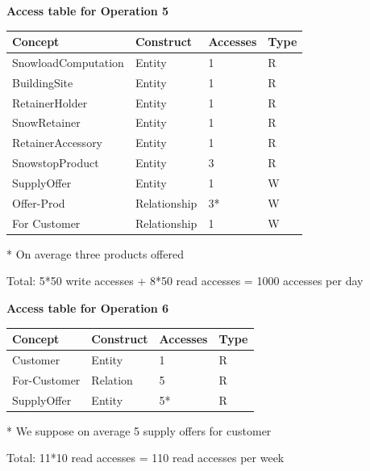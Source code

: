 \documentclass{article}[h]
\begin{document}
{{\vspace{12px}

{\centering \textbf{Access table for Operation 5}\\}
\begin{table}[H]
  \def\arraystretch{1.10}%
  \centering
  \begin{tabular}{ | m{4cm} | m{4cm}| m{3cm} | m{2cm} |} 
    \hline
    {\textbf{\large Concept}} & {\textbf{\large Construct}} & {\textbf{\large Accesses}} & {\textbf{\large Type}} \\
    \hline
    \color[HTML]{3531FF} SnowloadComputation & Entity & 1 & R \\ 
    \hline
    \color[HTML]{3531FF} BuildingSite & Entity & 1 & R \\ 
    \hline
    \color[HTML]{3531FF} RetainerHolder & Entity & 1 & R \\ 
    \hline
    \color[HTML]{3531FF} SnowRetainer & Entity & 1 & R \\ 
    \hline
    \color[HTML]{3531FF} RetainerAccessory & Entity & 1 & R \\ 
    \hline
    \color[HTML]{3531FF} SnowstopProduct & Entity & 3 & R \\ 
    \hline
    \color[HTML]{3531FF} SupplyOffer & Entity & 1 & W \\ 
    \hline
    \color[HTML]{3531FF} Offer-Prod & Relationship & 3* & W \\ 
    \hline
    \color[HTML]{3531FF} For Customer & Relationship & 1 & W \\ 
    \hline
  \end{tabular}
  \small{* On average three products offered}
\end{table}
Total: 5*50 write accesses + 8*50 read accesses = 1000 accesses per day

\vspace{12px}

{\centering \textbf{Access table for Operation 6}\\}
\begin{table}[H]
  \def\arraystretch{1.10}%
  \centering
  \begin{tabular}{ | m{4cm} | m{4cm}| m{3cm} | m{2cm} |} 
    \hline
    {\textbf{\large Concept}} & {\textbf{\large Construct}} & {\textbf{\large Accesses}} & {\textbf{\large Type}} \\
    \hline
    \color[HTML]{3531FF} Customer & Entity & 1 & R \\ 
    \hline
    \color[HTML]{3531FF} For-Customer & Relation & 5 & R \\ 
    \hline
    \color[HTML]{3531FF} SupplyOffer & Entity & 5* & R \\ 
    \hline
  \end{tabular}
  \small{* We suppose on average 5 supply offers for customer}
\end{table}
Total: 11*10 read accesses = 110 read accesses per week

}}
\end{document}
